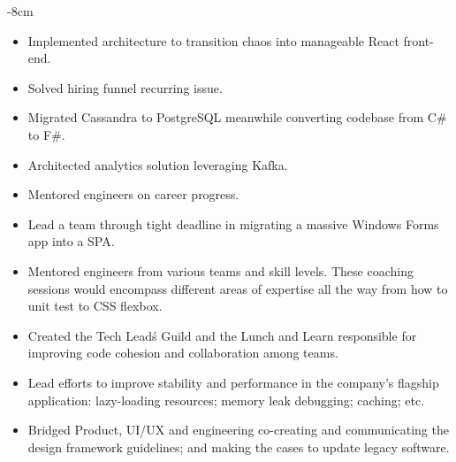 \documentclass[10pt,a4paper]{altacv}
\begin{document}

\begin{adjustwidth}{}{-8cm}
\makecvheader
\end{adjustwidth}


\begin{itemize}
\item Implemented architecture to transition chaos into manageable React front-end.
\item Solved hiring funnel recurring issue.
\item Migrated Cassandra to PostgreSQL meanwhile converting codebase from C\# to F\#.
\item Architected analytics solution leveraging Kafka.
\item Mentored engineers on career progress.
\end{itemize}
\divider

\begin{itemize}
\item Lead a team through tight deadline in migrating a massive Windows Forms app into a SPA.
\item Mentored engineers from various teams and skill levels. These coaching sessions would encompass different areas of expertise all the way from how to unit test to CSS flexbox.
\item Created the Tech Lead\'s Guild and the Lunch and Learn responsible for improving code cohesion and collaboration among teams.
\item Lead efforts to improve stability and performance in the company's flagship application: lazy-loading resources; memory leak debugging; caching; etc.
\item Bridged Product, UI/UX and engineering co-creating and communicating the design framework guidelines; and making the cases to update legacy software.
\end{itemize}
\divider
\end{document}
